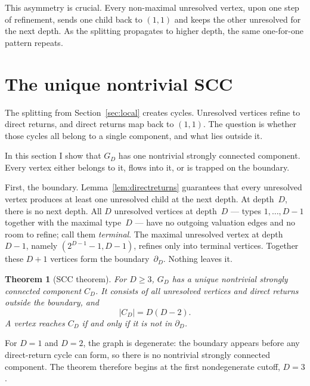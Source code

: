 \documentclass[11pt]{amsart}
\newtheorem{theorem}{Theorem}[section]
\theoremstyle{definition}
\theoremstyle{remark}
\newcommand{\bdD}{\partial_D}
\begin{document}
This asymmetry is crucial. Every non-maximal unresolved vertex, upon one step of refinement, sends one child back to $(1,1)$ and keeps the other unresolved for the next depth. As the splitting propagates to higher depth, the same one-for-one pattern repeats.

\section{The unique nontrivial SCC}\label{sec:core}

The splitting from Section~\ref{sec:local} creates cycles. Unresolved vertices refine to direct returns, and direct returns map back to $(1,1)$. The question is whether those cycles all belong to a single component, and what lies outside it.

In this section I show that $G_D$ has one nontrivial strongly connected component. Every vertex either belongs to it, flows into it, or is trapped on the boundary.

First, the boundary.  Lemma~\ref{lem:directreturns} guarantees that every unresolved vertex produces at least one unresolved child at the next depth.  At depth~$D$, there is no next depth.  All $D$ unresolved vertices at depth~$D$ — types $1,\ldots,D-1$ together with the maximal type~$D$ — have no outgoing valuation edges and no room to refine; call them \emph{terminal}.  The maximal unresolved vertex at depth $D-1$, namely $(2^{D-1}-1,D-1)$, refines only into terminal vertices.  Together these $D+1$ vertices form the boundary~$\bdD$.  Nothing leaves it.

\begin{theorem}[SCC theorem]\label{thm:core}
For $D\ge3$, $G_D$ has a unique nontrivial strongly connected
component $C_D$.  It consists of all unresolved vertices and direct
returns outside the boundary, and
\[
|C_D|=D(D-2).
\]
A vertex reaches $C_D$ if and only if it is not in $\bdD$.
\end{theorem}

For $D=1$ and $D=2$, the graph is degenerate: the boundary appears before any direct-return cycle can form, so there is no nontrivial strongly connected component.  The theorem therefore begins at the first nondegenerate cutoff, $D=3$.
\end{document}
